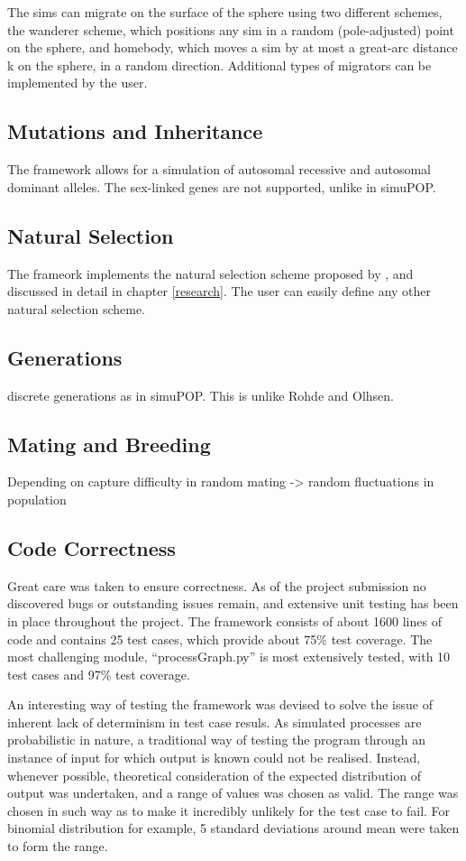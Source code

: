 \documentclass{l4proj}
\begin{document}
The sims can migrate on the surface of the sphere using two different schemes, the wanderer scheme, which positions any sim in a random (pole-adjusted) point on the sphere, and homebody, which moves a sim by at most a great-arc distance k on the sphere, in a random direction. Additional types of migrators can be implemented by the user.

\subsection{Mutations and Inheritance}

The framework allows for a simulation of \gls{autosomal} recessive and \gls{autosomal} dominant alleles. The \gls{sex-linked} genes are not supported, unlike in simuPOP.

\subsection{Natural Selection}

The frameork implements the natural selection scheme proposed by \cite{peng10}, and discussed in detail in chapter \ref{research}. The user can easily define any other natural selection scheme.

\subsection{Generations}
discrete generations as in simuPOP. This is unlike Rohde and Olhsen.

\subsection{Mating and Breeding}
Depending on 
capture difficulty in random mating -> random fluctuations in population

\subsection{Code Correctness}
Great care was taken to ensure correctness. As of the project submission no discovered bugs or outstanding issues remain, and extensive unit testing has been in place throughout the project. The framework consists of about 1600 lines of code and contains 25 test cases, which provide about 75\% test coverage. The most challenging module, ``processGraph.py'' is most extensively tested, with 10 test cases and 97\% test coverage.

An interesting way of testing the framework was devised to solve the issue of inherent lack of determinism in test case resuls. As simulated processes are probabilistic in nature, a traditional way of testing the program through an instance of input for which output is known could not be realised. Instead, whenever possible, theoretical consideration of the expected distribution of output was undertaken, and a range of values was chosen as valid. The range was chosen in such way as to make it incredibly unlikely for the test case to fail. For binomial distribution for example, 5 standard deviations around mean were taken to form the range.
\end{document}
